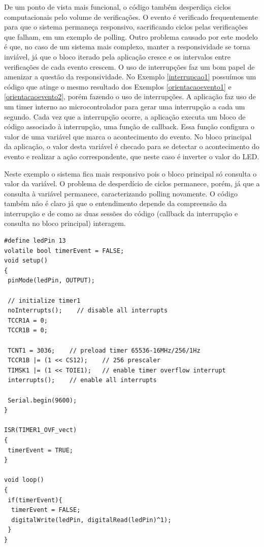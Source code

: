 \documentclass{article}
\begin{document}
\par De um ponto de vista mais funcional, o código também desperdiça ciclos computacionais pelo volume de verificações. O evento é verificado frequentemente para que o sistema permaneça responsivo, sacrificando ciclos pelas verificações que falham, em um exemplo de polling. Outro problema causado por este modelo é que, no caso de um sistema mais complexo, manter a responsividade se torna inviável, já que o bloco iterado pela aplicação cresce e os intervalos entre verificações de cada evento crescem. O uso de interrupções faz um bom papel de amenizar a questão da responsividade. No Exemplo \ref{interrupcao1} possuímos um código que atinge o mesmo resultado dos Exemplos \ref{orientacaoevento1} e \ref{orientacaoevento2}, porém fazendo o uso de interrupções. A aplicação faz uso de um timer interno ao microcontrolador para gerar uma interrupção a cada um segundo. Cada vez que a interrupção ocorre, a aplicação executa um bloco de código associado à interrupção, uma função de callback. Essa função configura o valor de uma variável que marca o acontecimento do evento. No bloco principal da aplicação, o valor desta variável é checado para se detectar o acontecimento do evento e realizar a ação correspondente, que neste caso é inverter o valor do LED.
\par Neste exemplo o sistema fica mais responsivo pois o bloco principal só consulta o valor da variável. O problema de desperdício de ciclos permanece, porém, já que a consulta à variável permanece, caracterizando polling novamente. O código também não é claro já que o entendimento depende da compreensão da interrupção e de como as duas sessões do código (callback da interrupção e consulta no bloco principal) interagem.

\begin{lstlisting}[style=CStyle,label=interrupcao1,caption=Aplicação utilizando interrupção]
#define ledPin 13
volatile bool timerEvent = FALSE;
void setup()
{
 pinMode(ledPin, OUTPUT);

 // initialize timer1 
 noInterrupts();    // disable all interrupts
 TCCR1A = 0;
 TCCR1B = 0;

 TCNT1 = 3036;    // preload timer 65536-16MHz/256/1Hz
 TCCR1B |= (1 << CS12);    // 256 prescaler 
 TIMSK1 |= (1 << TOIE1);   // enable timer overflow interrupt
 interrupts();    // enable all interrupts
  
 Serial.begin(9600);
}

ISR(TIMER1_OVF_vect)
{
 timerEvent = TRUE;
}

void loop()
{
 if(timerEvent){
  timerEvent = FALSE;
  digitalWrite(ledPin, digitalRead(ledPin)^1);
 }
}
\end{lstlisting}
\end{document}
